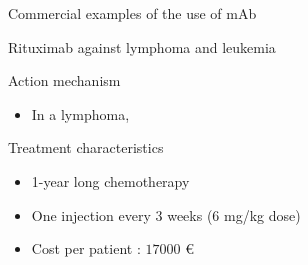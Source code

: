 \begin{frame}{Commercial examples of the use of mAb}
    \begin{block}{Rituximab against lymphoma and leukemia}
        \begin{exampleblock}{Action mechanism}
            \begin{itemize}
                \item In a lymphoma, 
            \end{itemize}
        \end{exampleblock}
        
        \begin{exampleblock}{Treatment characteristics}
            \begin{itemize}
                \item 1-year long chemotherapy
                \item One injection every 3 weeks ($6$ mg/kg dose)
                \item Cost per patient : $17000$ €
            \end{itemize}
        \end{exampleblock}
    \end{block}
\end{frame}

